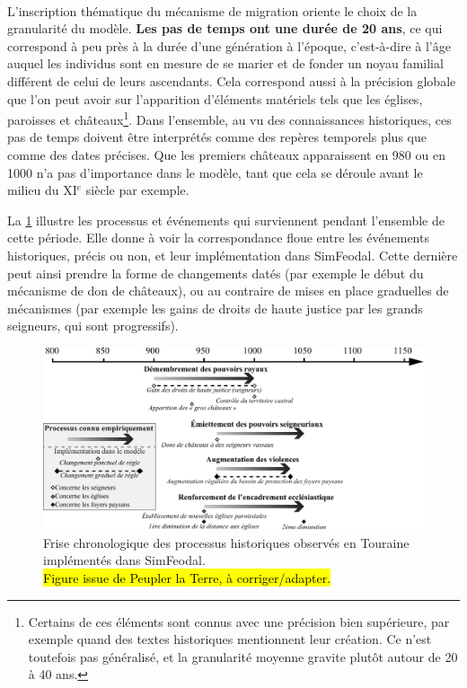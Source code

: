 \paragraph[Pas de temps de 20 ans]{} L'inscription thématique du mécanisme de migration oriente le choix de la granularité du modèle.
\textbf{Les pas de temps ont une durée de 20 ans}, ce qui correspond à peu près à la durée d'une génération à l'époque, c'est-à-dire à l'âge auquel les individus sont en mesure de se marier et de fonder un noyau familial différent de celui de leurs ascendants.
Cela correspond aussi à la précision globale que l'on peut avoir sur l'apparition d'éléments matériels tels que les églises, paroisses et châteaux\footnote{
Certains de ces éléments sont connus avec une précision bien supérieure, par exemple quand des textes historiques mentionnent leur création.
Ce n'est toutefois pas généralisé, et la granularité moyenne gravite plutôt autour de 20 à 40 ans.
}.
Dans l'ensemble, au vu des connaissances historiques, ces pas de temps doivent être interprétés comme des repères temporels plus que comme des dates précises. 
Que les premiers châteaux apparaissent en 980 ou en 1000 n'a pas d'importance dans le modèle, tant que cela se déroule avant le milieu du XI$^e$ siècle par exemple.

La \cref{fig:frise-chrono} illustre les processus et événements qui surviennent pendant l'ensemble de cette période.
Elle donne à voir la correspondance floue entre les événements historiques, précis ou non, et leur implémentation dans SimFeodal.
Cette dernière peut ainsi prendre la forme de changements datés (par exemple le début du mécanisme de don de châteaux), ou au contraire de mises en place graduelles de mécanismes (par exemple les gains de droits de haute justice par les grands seigneurs, qui sont progressifs).

\begin{figure}[H]
	\centering
	\includegraphics[width=\linewidth]{img/frise_chrono_tmd.pdf}
	\caption[Frise chronologique des processus historiques observés en Touraine implémentés dans SimFeodal.]{Frise chronologique des processus historiques observés en Touraine implémentés dans SimFeodal.\\
		\hl{Figure issue de Peupler la Terre, à corriger/adapter.}}
	\label{fig:frise-chrono}
\end{figure}



